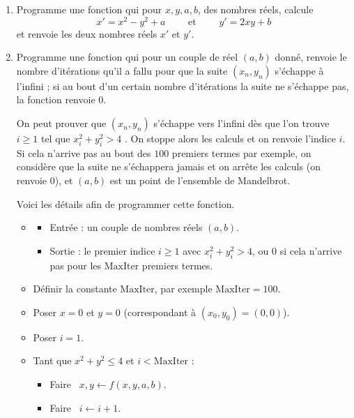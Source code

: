 \documentclass[11pt,class=report,crop=false]{standalone}
\begin{document}
\begin{activite}


\begin{enumerate}
  \item Programme une fonction   qui pour $x,y,a,b$, des nombres réels, calcule 
  $$x' = x^2-y^2+a \qquad \text{ et } \qquad y' = 2xy+b$$
  et renvoie les deux nombres réels $x'$ et $y'$.
  
  \item Programme une fonction  
  qui pour un couple de réel $(a,b)$ donné, renvoie le nombre d'itérations qu'il a fallu pour que la suite $(x_n,y_n)$ s'échappe \og{}à l'infini\fg{} ; si au bout d'un certain nombre d'itérations la suite ne s'échappe pas, la fonction renvoie $0$.
  

On peut prouver que $(x_n,y_n)$ s'échappe vers l'infini dès que l'on trouve $i\ge1$ tel que $x_i^2 + y_i^2 > 4$ . On stoppe alors les calculs et on renvoie l'indice $i$.
Si cela n'arrive pas au bout des $100$ premiers termes par exemple, on considère que la suite ne s'échappera jamais et on arrête les calculs (on renvoie $0$), et $(a,b)$ est un point de l'ensemble de Mandelbrot.
  
  Voici les détails afin de programmer cette fonction.
  \begin{algorithme}
  \sauteligne 
 \begin{itemize}
   \item
   \begin{itemize}
     \item Entrée : un couple de nombres réels $(a,b)$.
     \item Sortie : le premier indice $i\ge1$ avec $x_i^2+y_i^2>4$, ou $0$ si cela n'arrive pas pour les $\text{MaxIter}$ premiers termes.
   \end{itemize}

  \item Définir la constante $\text{MaxIter}$, par exemple $\text{MaxIter} = 100$.
  
  \item Poser $x=0$ et $y=0$ (correspondant à $(x_0,y_0) = (0,0)$).
  
  \item Poser $i=1$.
         
  \item Tant que $x^2+y^2 \le 4$ et $i < \text{MaxIter}$ :
       \begin{itemize}
         \item Faire \ $x,y \leftarrow f(x,y,a,b)$.
         \item Faire \ $i \leftarrow i+1$.
       \end{itemize}


\end{itemize}
\end{algorithme}
\end{enumerate}
\end{activite}
\end{document}
